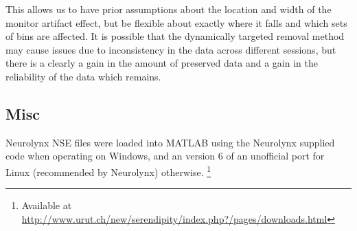 This allows us to have prior assumptions about the location and width of the monitor artifact effect, but be flexible about exactly where it falls and which sets of bins are affected.
It is possible that the dynamically targeted removal method may cause issues due to inconsistency in the data across different sessions, but there is a clearly a gain in the amount of preserved data and a gain in the reliability of the data which remains.


\subsection{Misc}

Neurolynx NSE files were loaded into MATLAB using the Neurolynx supplied code when operating on Windows, and an version 6 of an unofficial port for Linux (recommended by Neurolynx) otherwise.%
\footnote{Available at
\\ \url{http://www.urut.ch/new/serendipity/index.php?/pages/downloads.html}}
